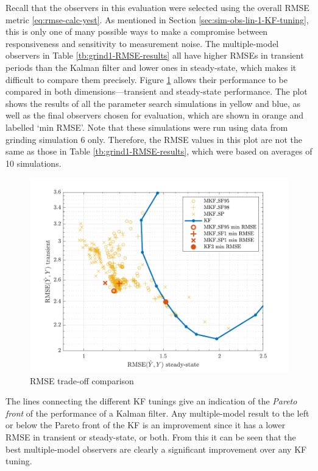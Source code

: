 Recall that the observers in this evaluation were selected using the overall \gls{RMSE} metric \eqref{eq:rmse-calc-yest}. As mentioned in Section \ref{sec:sim-obs-lin-1-KF-tuning}, this is only one of many possible ways to make a compromise between responsiveness and sensitivity to measurement noise. The multiple-model observers in Table \ref{tb:grind1-RMSE-results} all have higher \gls{RMSE}s in transient periods than the Kalman filter and lower ones in steady-state, which makes it difficult to compare them precisely. Figure \ref{fig:grind1-RMSE-scatter} allows their performance to be compared in both dimensions---transient and steady-state performance. The plot shows the results of all the parameter search simulations in yellow and blue, as well as the final observers chosen for evaluation, which are shown in orange and labelled `min RMSE'. Note that these simulations were run using data from grinding simulation 6 only. Therefore, the \gls{RMSE} values in this plot are not the same as those in Table \ref{tb:grind1-RMSE-results}, which were based on averages of 10 simulations.
\begin{figure}[htp]
	\centering
	\includegraphics[width=13cm]{images/grind1_rod_obs_sim_popt_RMSE_scatter.pdf}
	\caption{RMSE trade-off comparison}
	\label{fig:grind1-RMSE-scatter}
\end{figure}
The lines connecting the different \gls{KF} tunings give an indication of the \textit{Pareto front} of the performance of a Kalman filter. Any multiple-model result to the left or below the Pareto front of the \gls{KF} is an improvement since it has a lower \gls{RMSE} in transient or steady-state, or both. From this it can be seen that the best multiple-model observers are clearly a significant improvement over any \gls{KF} tuning.

